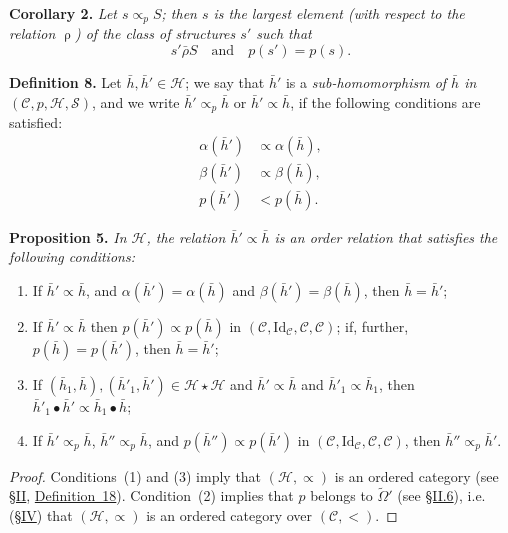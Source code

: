 \documentclass[a4paper,oneside,nobib,nofonts,notitlepage,notoc,nols,fleqn,justified]{tufte-book}
\newenvironment{itenv}[1]
  {\phantomsection\par\medskip\noindent\textbf{#1.}\itshape}
  {\par\medskip}
\newenvironment{rmenv}[1]
  {\phantomsection\par\medskip\noindent\textbf{#1.}\rmfamily}
  {\par\medskip}
\newcommand{\CC}{\mathcal{C}}
\newcommand{\HH}{\mathcal{H}}
\renewcommand{\SS}{\mathcal{S}}
\newcommand{\relrho}{\mathrel{\rho}}
\newcommand{\relrhobar}{\mathrel{\bar{\rho}}}
\newcommand{\subs}{\mathrel{\propto}}
\newcommand{\Id}{\mathrm{Id}}
\begin{document}
\begin{itenv}{Corollary 2}
  Let $s\subs_p S$;
  then $s$ is the largest element (with respect to the relation $\relrho$) of the class of structures $s'$ such that
  \[
    s'\relrhobar S
    \quad\text{and}\quad
    p(s') = p(s).
  \]
\end{itenv}

\begin{rmenv}{Definition 8}
\label{definition:i-8}
  Let $\bar{h},\bar{h}'\in\HH$;
  we say that $\bar{h}'$ is a \emph{sub-homomorphism of $\bar{h}$ in $(\CC,p,\HH,\SS)$}, and we write $\bar{h}'\subs_p\bar{h}$ or $\bar{h}'\subs\bar{h}$, if the following conditions are satisfied:
  \[
    \begin{aligned}
      \alpha(\bar{h}')
      &\subs \alpha(\bar{h}),
    \\\beta(\bar{h}')
      &\subs \beta(\bar{h}),
    \\p(\bar{h}')
      &< p(\bar{h}).
    \end{aligned}
  \]
\end{rmenv}

\begin{itenv}{Proposition 5}
\label{proposition:i-5}
  In $\HH$, the relation $\bar{h}'\subs\bar{h}$ is an order relation that satisfies the following conditions:
  \begin{enumerate}
    \item[\normalfont(1)]
      If $\bar{h}'\subs\bar{h}$, and $\alpha(\bar{h}')=\alpha(\bar{h})$ and $\beta(\bar{h}')=\beta(\bar{h})$, then $\bar{h}=\bar{h}'$;
    \item[\normalfont(2)]
      If $\bar{h}'\subs\bar{h}$ then $p(\bar{h}')\subs p(\bar{h})$ in $(\CC,\Id_\CC,\CC,\CC)$;
      if, further, $p(\bar{h})=p(\bar{h}')$, then $\bar{h}=\bar{h}'$;
    \item[\normalfont(3)]
      If $(\bar{h}_1,\bar{h}),(\bar{h}'_1,\bar{h}')\in\HH\star\HH$ and $\bar{h}'\subs\bar{h}$ and $\bar{h}'_1\subs\bar{h}_1$, then $\bar{h}'_1\bullet\bar{h}'\subs\bar{h}_1\bullet\bar{h}$;
    \item[\normalfont(4)]
      If $\bar{h}'\subs_p\bar{h}$, $\bar{h}''\subs_p\bar{h}$, and $p(\bar{h}'')\subs p(\bar{h}')$ in $(\CC,\Id_\CC,\CC,\CC)$, then $\bar{h}''\subs_p\bar{h}'$.
  \end{enumerate}
\end{itenv}

\begin{proof}
  Conditions~(1) and (3) imply that $(\HH,\subs)$ is an ordered category (see \hyperref[section:ii]{§II}, \hyperref[definition:i-18]{Definition~18}).
  Condition~(2) implies that $p$ belongs to $\widetilde{\Omega}'$ (see \hyperref[section:ii.6]{§II.6}), i.e. (\hyperref[section:iv]{§IV}) that $(\HH,\subs)$ is an ordered category over $(\CC,<)$.
\end{proof}
\end{document}
